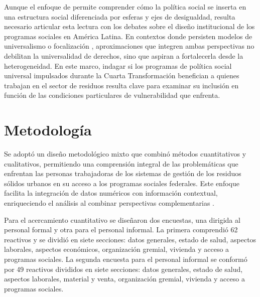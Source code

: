 \documentclass[
  spanish,
  11pt,
  a4paper,
]{scrbook}
\begin{document}
Aunque el enfoque de \textcite{Adelantado1998} permite comprender cómo
la política social se inserta en una estructura social diferenciada por
esferas y ejes de desigualdad, resulta necesario articular esta lectura
con los debates sobre el diseño institucional de los programas sociales
en América Latina. En contextos donde persisten modelos de universalismo
o focalización \autocite{Cohen2005}, aproximaciones que integren ambas
perspectivas no debilitan la universalidad de derechos, sino que aspiran
a fortalecerla desde la heterogeneidad. En este marco, indagar si los
programas de política social universal impulsados durante la Cuarta
Transformación benefician a quienes trabajan en el sector de residuos
resulta clave para examinar su inclusión en función de las condiciones
particulares de vulnerabilidad que enfrenta.

\section*{Metodología}\label{metodologuxeda}


Se adoptó un diseño metodológico mixto que combinó métodos cuantitativos
y cualitativos, permitiendo una comprensión integral de las
problemáticas que enfrentan las personas trabajadoras de los sistemas de
gestión de los residuos sólidos urbanos en su acceso a los programas
sociales federales. Este enfoque facilita la integración de datos
numéricos con información contextual, enriqueciendo el análisis al
combinar perspectivas complementarias \autocite{Creswell2014}.

Para el acercamiento cuantitativo se diseñaron dos encuestas, una
dirigida al personal formal y otra para el personal informal. La primera
comprendió 62 reactivos y se dividió en siete secciones: datos
generales, estado de salud, aspectos laborales, aspectos económicos,
organización gremial, vivienda y acceso a programas sociales. La segunda
encuesta para el personal informal se conformó por 49 reactivos
divididos en siete secciones: datos generales, estado de salud, aspectos
laborales, material y venta, organización gremial, vivienda y acceso a
programas sociales.
\end{document}
